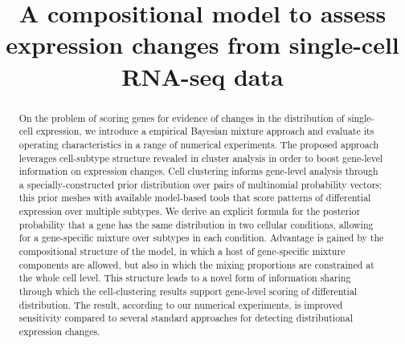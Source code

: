 \documentclass[aoas,preprint]{imsart}
\begin{document}
\begin{frontmatter}
\title{A compositional model to assess expression changes from
 single-cell RNA-seq data}



\begin{abstract}
On the problem of scoring genes for evidence of changes in the distribution of single-cell expression, we
introduce a empirical Bayesian mixture approach and evaluate its operating characteristics 
in a range of numerical experiments.  The proposed approach leverages cell-subtype 
structure revealed in cluster analysis in order to boost gene-level information on expression changes.
Cell clustering informs gene-level analysis through a specially-constructed prior distribution
over pairs of multinomial probability vectors; this prior meshes with available model-based tools
that score patterns of differential expression over multiple subtypes.   
We derive an explicit formula for the posterior probability that a gene has the same distribution
in two cellular conditions, allowing for a gene-specific mixture over subtypes in each condition.
Advantage is gained by the compositional structure of the model, in which a host of gene-specific
mixture components are allowed, but also in which the mixing proportions are constrained at the whole 
cell level.  This structure leads to a novel form of information sharing through which the cell-clustering
results support gene-level scoring of differential distribution.  The result, according to our
numerical experiments, is improved sensitivity compared to several standard approaches
 for detecting distributional expression changes.  
\end{abstract}


\end{frontmatter}
\end{document}
